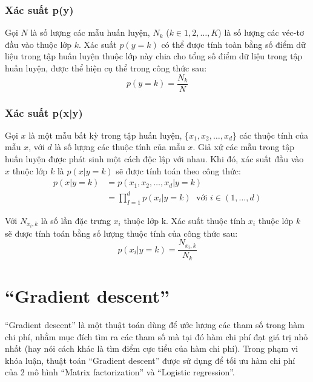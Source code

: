 \subsubsection{Xác suất p(y)}
Gọi $N$ là số lượng các mẫu huấn luyện, $N_k$ ($k \in {1,2,\dots,K}$) là số lượng các véc-tơ đầu vào thuộc lớp $k$. Xác suất $p(y=k)$ có thể được tính toàn bằng số điểm dữ liệu trong tập huấn luyện thuộc lớp này chia cho tổng số điểm dữ liệu trong tập huấn luyện, được thể hiện cụ thể trong công thức sau:
\begin{equation}
    \label{eq:2.3_p(y)}
    p(y=k) = \frac{N_k}{N}
\end{equation}

\subsubsection{Xác suất p(x|y)}
Gọi $x$ là một mẫu bất kỳ trong tập huấn luyện, \{$x_1, x_2, \dots, x_d$\} các thuộc tính của mẫu $x$, với $d$ là số lượng các thuộc tính của mẫu $x$. Giả xử các mẫu trong tập huấn luyện được phát sinh một cách độc lập với nhau. Khi đó, xác suất đầu vào $x$ thuộc lớp $k$ là $p(x|y=k)$ sẽ được tính toán theo công thức:
\begin{equation}
    \label{eq:2.3_p(x|y)}
    \begin{split}
        p(x|y=k) &= p(x_1, x_2, \dots, x_d|y=k)\\
        &= \prod_{I=1}^{d} p(x_i|y=k) \; \text{ với } i \in (1,\dots,d)
    \end{split}
\end{equation}

Với $N_{x_i, k}$ là số lần đặc trưng $x_i$ thuộc lớp k. Xác suất thuộc tính $x_i$ thuộc lớp $k$ sẽ được tính toán bằng số lượng thuộc tính của
công thức sau:
\begin{equation}
    p(x_i|y=k) = \frac{N_{x_i, k}}{N_k}
\end{equation}

\section{``Gradient descent''}
``Gradient descent'' là một thuật toán dùng để ước lượng các tham số trong hàm chi phí, nhằm mục đích tìm ra các tham số mà tại đó hàm chi phí đạt giá trị nhỏ nhất (hay nói cách khác là tìm điểm cực tiểu của hàm chi phí). Trong phạm vi khóa luận, thuật toán ``Gradient descent'' được sử dụng để tối ưu hàm chi phí của 2 mô hình ``Matrix factorization'' và ``Logistic regression''.
